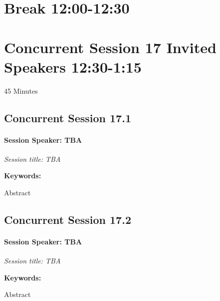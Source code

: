\documentclass[
]{book}
\begin{document}
\hypertarget{break-1200-1230-1}{%
\section*{Break \textbar{} 12:00-12:30}\label{break-1200-1230-1}}

\hypertarget{concurrent-session-17-invited-speakers-1230-115}{%
\section*{Concurrent Session 17 \textbar{} Invited Speakers \textbar{} 12:30-1:15}\label{concurrent-session-17-invited-speakers-1230-115}}

45 Minutes

\hypertarget{concurrent-session-17.1}{%
\subsection*{Concurrent Session 17.1}\label{concurrent-session-17.1}}

\begin{speaker}
\hypertarget{session-speaker-tba}{%
\paragraph{\texorpdfstring{Session Speaker:
\textbf{TBA}}{Session Speaker: TBA}}\label{session-speaker-tba}}

\emph{Session title: TBA}

\textbf{Keywords:}

Abstract
\end{speaker}

\hypertarget{concurrent-session-17.2}{%
\subsection*{Concurrent Session 17.2}\label{concurrent-session-17.2}}

\begin{speaker}
\hypertarget{session-speaker-tba}{%
\paragraph{\texorpdfstring{Session Speaker:
\textbf{TBA}}{Session Speaker: TBA}}\label{session-speaker-tba}}

\emph{Session title: TBA}

\textbf{Keywords:}

Abstract
\end{speaker}
\end{document}
